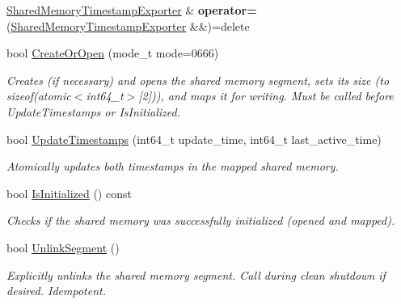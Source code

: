 \begin{DoxyCompactItemize}
\item 
\mbox{\label{classEventDetect_1_1SharedMemoryTimestampExporter_a76ece0e36a546fc701e2c188f2a6ef1a}} 
\mbox{\hyperlink{classEventDetect_1_1SharedMemoryTimestampExporter}{Shared\+Memory\+Timestamp\+Exporter}} \& {\bfseries operator=} (\mbox{\hyperlink{classEventDetect_1_1SharedMemoryTimestampExporter}{Shared\+Memory\+Timestamp\+Exporter}} \&\&)=delete
\item 
bool \mbox{\hyperlink{classEventDetect_1_1SharedMemoryTimestampExporter_ad1fe3658105dcec5df31c8859d843cc5}{Create\+Or\+Open}} (mode\+\_\+t mode=0666)
\begin{DoxyCompactList}\small\item\em Creates (if necessary) and opens the shared memory segment, sets its size (to sizeof(atomic$<$int64\+\_\+t$>$\mbox{[}2\mbox{]})), and maps it for writing. Must be called before Update\+Timestamps or Is\+Initialized. \end{DoxyCompactList}\item 
bool \mbox{\hyperlink{classEventDetect_1_1SharedMemoryTimestampExporter_af3f039d814ed24dde56b1d525d340a34}{Update\+Timestamps}} (int64\+\_\+t update\+\_\+time, int64\+\_\+t last\+\_\+active\+\_\+time)
\begin{DoxyCompactList}\small\item\em Atomically updates both timestamps in the mapped shared memory. \end{DoxyCompactList}\item 
bool \mbox{\hyperlink{classEventDetect_1_1SharedMemoryTimestampExporter_a3e058d7e830a8ae6bb59dfa7a7673a5c}{Is\+Initialized}} () const
\begin{DoxyCompactList}\small\item\em Checks if the shared memory was successfully initialized (opened and mapped). \end{DoxyCompactList}\item 
bool \mbox{\hyperlink{classEventDetect_1_1SharedMemoryTimestampExporter_a7aab6c44488a85d6272606b2f733f2bc}{Unlink\+Segment}} ()
\begin{DoxyCompactList}\small\item\em Explicitly unlinks the shared memory segment. Call during clean shutdown if desired. Idempotent. \end{DoxyCompactList}\end{DoxyCompactItemize}

